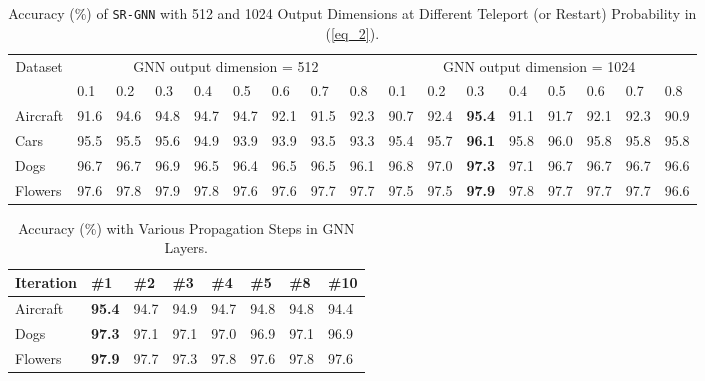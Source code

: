 \documentclass[journal]{IEEEtran}
\begin{document}
\begin{table*} 
\begin{center}
 \caption{Accuracy (\%) of \texttt{SR-GNN} with 512 and 1024 Output Dimensions at Different Teleport (or Restart) Probability  in (\ref{eq_2}).  }
 \label{table:APPNP_alpha2}
 \begin{small}
\begin{tabular}{|l|p{4.0 mm} p{4.5 mm} p{4.5 mm} p{4.5 mm} p{4.5 mm} p{4.5 mm} p{5 mm} p{5 mm}| p{4.0 mm} p{4.5 mm} p{4.5 mm} p{4.5 mm} p{4.5 mm} p{4.5 mm} p{5 mm} p{5 mm}| }
 \hline
 \multicolumn{1}{|c|}{Dataset} &
 \multicolumn{8}{|c|}{GNN output dimension = 512}  & \multicolumn{8}{|c|}{GNN output dimension = 1024} \\
 & 0.1 & 0.2 & 0.3 & 0.4 & 0.5 & 0.6 & 0.7 & 0.8 & 0.1 & 0.2 & 0.3 & 0.4 & 0.5 & 0.6 & 0.7 & 0.8     \\ 
    \hline
  Aircraft &  91.6 &94.6 & 94.8 &94.7 &94.7 &92.1 &91.5 & 92.3 
  & 90.7 & 92.4 & \textbf{95.4} & 91.1 & 91.7 &92.1 &92.3 &90.9 \\
   Cars & 95.5 & 95.5 & 95.6 &94.9 & 93.9 & 93.9 &93.5 & 93.3
   & 95.4 & 95.7 & \textbf{96.1} & 95.8 & 96.0 &95.8 & 95.8 & 95.8\\
  Dogs & 96.7 & 96.7 & 96.9 &96.5 & 96.4 & 96.5 &96.5 & 96.1
    & 96.8 & 97.0 & \textbf{97.3} & 97.1 & 96.7 &96.7 &96.7 & 96.6\\ 
  Flowers & 97.6 & 97.8 & 97.9 & 97.8 & 97.6 &97.6 &97.7 & 97.7
  & 97.5 & 97.5 & \textbf{97.9} & 97.8 & 97.7 & 97.7 & 97.7 & 96.6\\
\hline
\end{tabular}
\end{small}
 \end{center}
 \vspace{-0.5cm}
\end{table*}
\begin{table}[h]
\begin{center}
 \caption{Accuracy (\%) with Various Propagation Steps in GNN Layers. }
\begin{tabular}{|l| p{4.5 mm} p{4.5 mm} p{4.5 mm} p{4.5 mm} p{4.5 mm} p{4.5 mm} p{4.5 mm}| }
 \hline
Iteration & \#1 &\#2 &\#3  &\#4 &\#5 &\#8 &\#10 \\
    \hline
Aircraft & \textbf{95.4} &94.7 &94.9  &94.7 &94.8 &94.8 &94.4\\
Dogs & \textbf{97.3} &97.1 &97.1 &97.0 &96.9 &97.1 &96.9  \\
Flowers & \textbf{97.9}  &97.7 &97.3 &97.8 & 97.6 &97.8 &97.6\\ 
\hline
\end{tabular}
 \label{table:iter}
 \end{center}
 \vspace{- 0.5 cm}
\end{table}
\end{document}
